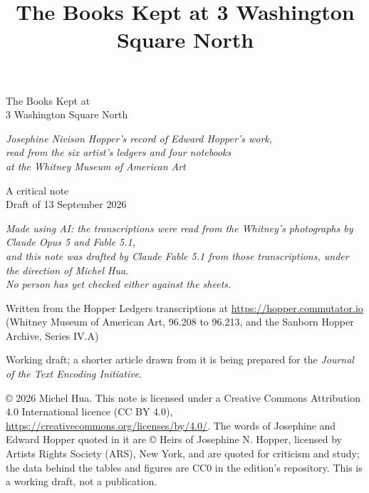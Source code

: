 \documentclass[11pt,twoside,openany]{book}
\title{The Books Kept at 3 Washington Square North}
\author{}
\date{}
\begin{document}
\frontmatter
\begin{titlepage}
\centering
\vspace*{30mm}
{\Huge The Books Kept at\\[4pt] 3 Washington Square North\par}
\vspace{10mm}
{\Large\itshape Josephine Nivison Hopper's record of Edward Hopper's work,\\ read from the six artist's ledgers and four notebooks\\ at the Whitney Museum of American Art\par}
\vspace{14mm}
{\large A critical note\\ Draft of 13 September 2026\par}
\vspace{8mm}
{\normalsize\itshape Made using AI: the transcriptions were read from the Whitney's photographs by Claude Opus 5 and Fable 5.1,\\ and this note was drafted by Claude Fable 5.1 from those transcriptions, under the direction of Michel Hua.\\ No person has yet checked either against the sheets.\par}
\vspace{40mm}
{\small Written from the Hopper Ledgers transcriptions at \url{https://hopper.commutator.io}\\ (Whitney Museum of American Art, 96.208 to 96.213, and the Sanborn Hopper Archive, Series IV.A)\par}
\vfill
{\small Working draft; a shorter article drawn from it is being prepared for the \emph{Journal of the Text Encoding Initiative}.\par}
\vspace{4mm}
{\footnotesize © 2026 Michel Hua. This note is licensed under a Creative Commons Attribution 4.0 International licence (CC BY 4.0), \url{https://creativecommons.org/licenses/by/4.0/}. The words of Josephine and Edward Hopper quoted in it are © Heirs of Josephine N. Hopper, licensed by Artists Rights Society (ARS), New York, and are quoted for criticism and study; the data behind the tables and figures are CC0 in the edition's repository. This is a working draft, not a publication.\par}
\end{titlepage}
\cleardoublepage

\cleardoublepage

\tableofcontents
\listoffigures
\mainmatter











\appendix

\backmatter

\end{document}

